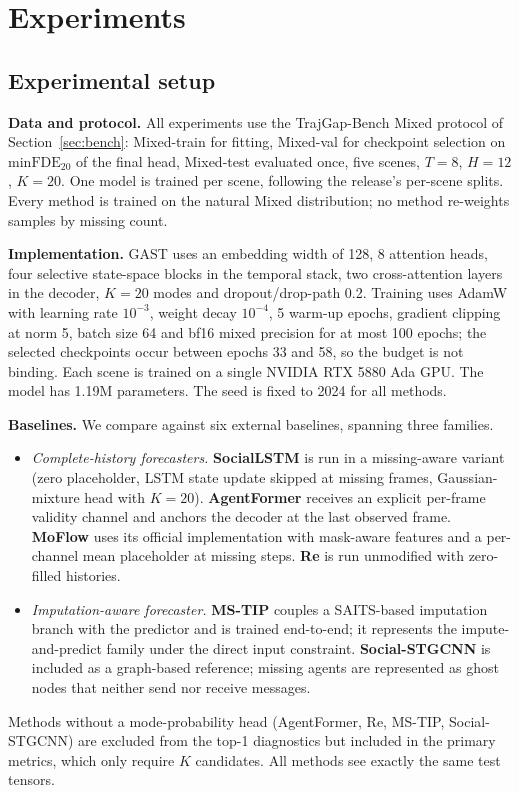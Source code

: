 \section{Experiments}
\label{sec:exp}

\subsection{Experimental setup}
\label{sec:setup}

\textbf{Data and protocol.} All experiments use the TrajGap-Bench Mixed protocol of Section~\ref{sec:bench}: Mixed-train for fitting, Mixed-val for checkpoint selection on $\mathrm{minFDE}_{20}$ of the final head, Mixed-test evaluated once, five scenes, $T=8$, $H=12$, $K=20$. One model is trained per scene, following the release's per-scene splits. Every method is trained on the natural Mixed distribution; no method re-weights samples by missing count.

\textbf{Implementation.} GAST uses an embedding width of 128, 8 attention heads, four selective state-space blocks in the temporal stack, two cross-attention layers in the decoder, $K=20$ modes and dropout/drop-path 0.2. Training uses AdamW with learning rate $10^{-3}$, weight decay $10^{-4}$, 5 warm-up epochs, gradient clipping at norm 5, batch size 64 and bf16 mixed precision for at most 100 epochs; the selected checkpoints occur between epochs 33 and 58, so the budget is not binding. Each scene is trained on a single NVIDIA RTX 5880 Ada GPU. The model has 1.19M parameters. The seed is fixed to 2024 for all methods.

\textbf{Baselines.} We compare against six external baselines, spanning three families.
\begin{itemize}
\item \emph{Complete-history forecasters.} \textbf{SocialLSTM} \cite{alahi2016social} is run in a missing-aware variant (zero placeholder, LSTM state update skipped at missing frames, Gaussian-mixture head with $K=20$). \textbf{AgentFormer} \cite{yuan2021agentformer} receives an explicit per-frame validity channel and anchors the decoder at the last observed frame. \textbf{MoFlow} \cite{fu2025moflow} uses its official implementation with mask-aware features and a per-channel mean placeholder at missing steps. \textbf{Re} \cite{mao2025resonance} is run unmodified with zero-filled histories.
\item \emph{Imputation-aware forecaster.} \textbf{MS-TIP} \cite{chib2024mstip} couples a SAITS-based imputation branch with the predictor and is trained end-to-end; it represents the impute-and-predict family under the direct input constraint. \textbf{Social-STGCNN} \cite{mohamed2020social} is included as a graph-based reference; missing agents are represented as ghost nodes that neither send nor receive messages.
\end{itemize}
Methods without a mode-probability head (AgentFormer, Re, MS-TIP, Social-STGCNN) are excluded from the top-1 diagnostics but included in the primary metrics, which only require $K$ candidates. All methods see exactly the same test tensors.

